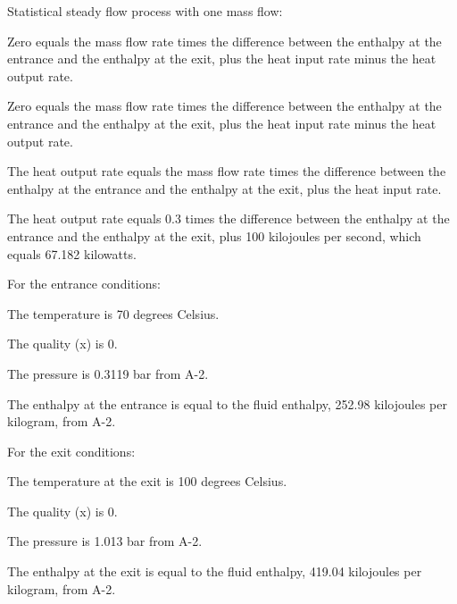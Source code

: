 Statistical steady flow process with one mass flow:

Zero equals the mass flow rate times the difference between the enthalpy at the entrance and the enthalpy at the exit, plus the heat input rate minus the heat output rate.

Zero equals the mass flow rate times the difference between the enthalpy at the entrance and the enthalpy at the exit, plus the heat input rate minus the heat output rate.

The heat output rate equals the mass flow rate times the difference between the enthalpy at the entrance and the enthalpy at the exit, plus the heat input rate.

The heat output rate equals 0.3 times the difference between the enthalpy at the entrance and the enthalpy at the exit, plus 100 kilojoules per second, which equals 67.182 kilowatts.

For the entrance conditions:

The temperature is 70 degrees Celsius.

The quality (x) is 0.

The pressure is 0.3119 bar from A-2.

The enthalpy at the entrance is equal to the fluid enthalpy, 252.98 kilojoules per kilogram, from A-2.

For the exit conditions:

The temperature at the exit is 100 degrees Celsius.

The quality (x) is 0.

The pressure is 1.013 bar from A-2.

The enthalpy at the exit is equal to the fluid enthalpy, 419.04 kilojoules per kilogram, from A-2.